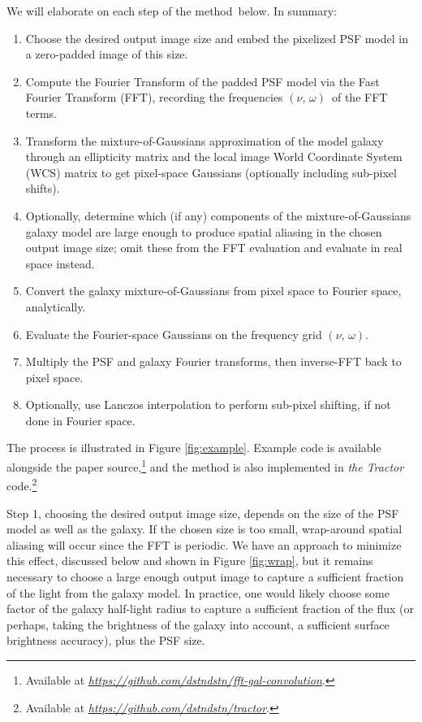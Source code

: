 \documentclass[11pt,preprint]{aastex}
\newcommand{\niceurl}[1]{\href{#1}{\textsl{#1}}}
\newcommand{\project}[1]{\textsl{#1}}
\newcommand{\trick}{method}
\newcommand{\pixelfreqs}{$(\nu,\, \omega)$}
\begin{document}
We will elaborate on each step of the \trick\ below.  In summary:
\begin{enumerate}
\item Choose the desired output image size and embed the pixelized PSF
  model in a zero-padded image of this size.
\item Compute the Fourier Transform of the padded PSF model via the
  Fast Fourier Transform (FFT),
  recording the frequencies \pixelfreqs\ of the FFT terms.
\item Transform the mixture-of-Gaussians approximation of the model
  galaxy through an ellipticity matrix and the local image World
  Coordinate System (WCS) matrix to get pixel-space Gaussians
  (optionally including sub-pixel shifts).
\item Optionally, determine which (if any) components of the
  mixture-of-Gaussians galaxy model are large enough to produce
  spatial aliasing in the chosen output image size; omit these from
  the FFT evaluation and evaluate in real space instead.
\item Convert the galaxy mixture-of-Gaussians from pixel space to Fourier space,
  analytically.
\item Evaluate the Fourier-space Gaussians on the frequency grid \pixelfreqs.
\item Multiply the PSF and galaxy Fourier transforms, then inverse-FFT
  back to pixel space.
\item Optionally, use Lanczos interpolation to perform sub-pixel shifting, if not
  done in Fourier space.
\end{enumerate}

The process is illustrated in Figure \ref{fig:example}.  Example code
is available alongside the paper source,\footnote{ Available at
  \niceurl{https://github.com/dstndstn/fft-gal-convolution}.}  and the
method is also implemented in \project{the Tractor} code.\footnote{%
  Available at
  \niceurl{https://github.com/dstndstn/tractor}.}

Step 1, choosing the desired output image size, depends on the size of
the PSF model as well as the galaxy.  If the chosen size is too small,
wrap-around spatial aliasing will occur since the FFT is periodic.  We have an
approach to minimize this effect, discussed below and shown in Figure
\ref{fig:wrap}, but it remains necessary to choose a large enough
output image to capture a sufficient fraction of the light from the
galaxy model.  In practice, one would likely choose some factor of
the galaxy half-light radius to capture a sufficient fraction of the
flux (or perhaps, taking the brightness of the galaxy into account, a
sufficient surface brightness accuracy), plus the PSF size.
\end{document}
